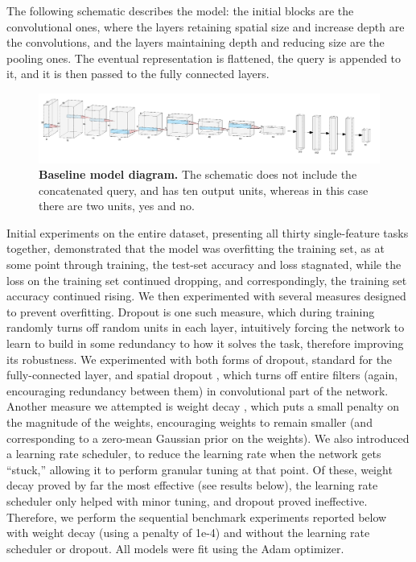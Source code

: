 The following schematic describes the model: the initial blocks are the convolutional ones, where the layers retaining spatial size and increase depth are the convolutions, and the layers maintaining depth and reducing size are the pooling ones. The eventual representation is flattened, the query is appended to it, and it is then passed to the fully connected layers.
\begin{figure}[!htb]
\centering
\includegraphics[width=\linewidth]{ch-models-compared/figures/baseline.png}
\caption[Baseline model diagram.]{{\bf Baseline model diagram.} The schematic does not include the concatenated query, and has ten output units, whereas in this case there are two units, yes and no. }
\label{fig:baseline-model-diagram}
\end{figure}

Initial experiments on the entire dataset, presenting all thirty single-feature tasks together, demonstrated that the model was overfitting the training set, as at some point through training, the test-set accuracy and loss stagnated, while the loss on the training set continued dropping, and correspondingly, the training set accuracy continued rising. We then experimented with several measures designed to prevent overfitting. Dropout is one such measure, which during training randomly turns off random units in each layer, intuitively forcing the network to learn to build in some redundancy to how it solves the task, therefore improving its robustness. We experimented with both forms of dropout, standard \parencite{Srivastava2014} for the fully-connected layer, and spatial dropout \parencite{Tompson2015}, which turns off entire filters (again, encouraging redundancy between them) in convolutional part of the network. Another measure we attempted is weight decay \parencite{Krogh1992}, which puts a small penalty on the magnitude of the weights, encouraging weights to remain smaller (and corresponding to a zero-mean Gaussian prior on the weights). We also introduced a learning rate scheduler, to reduce the learning rate when the network gets ``stuck,'' allowing it to perform granular tuning at that point. Of these, weight decay proved by far the most effective (see results below), the learning rate scheduler only helped with minor tuning, and dropout proved ineffective. Therefore, we perform the sequential benchmark experiments reported below with weight decay (using a penalty of 1e-4) and without the learning rate scheduler or dropout. All models were fit using the Adam \parencite{Kingma2015} optimizer.